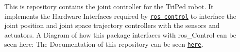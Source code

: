 This is repository contains the joint controller for the Tri\+Ped robot. It implements the Hardware Interfaces required by \href{http://wiki.ros.org/ros_control}{\tt ros\+\_\+control} to interface the joint position and joint space trajectory controllers with the sensors and actuators. A Diagram of how this package interfaces with ros\+\_\+\+Control can be seen here\+:  The Documentation of this repository can be seen \href{https://triped-robot.github.io/joint_level_control/html/index.html}{\tt here}. 
